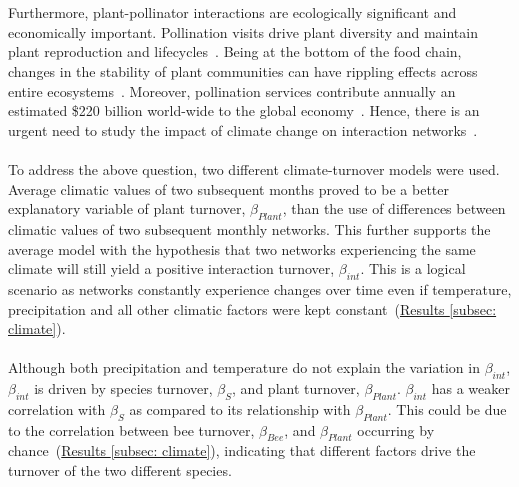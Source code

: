 \documentclass[11pt]{article}
\begin{document}
\\
\\
Furthermore, plant-pollinator interactions are ecologically significant and economically important. Pollination visits drive plant diversity and maintain plant reproduction and lifecycles~\citep{Olesen2008}. Being at the bottom of the food chain, changes in the stability of plant communities can have rippling effects across entire ecosystems~\citep{Scaven2013}. Moreover, pollination services contribute annually an estimated \$220 billion world-wide to the global economy~\citep{Gallai2009}. Hence, there is an urgent need to study the impact of climate change on interaction networks~\citep{Scaven2013}.\\
\\
To address the above question, two different climate-turnover models were used. Average climatic values of two subsequent months proved to be a better explanatory variable of plant turnover, $\beta_{Plant}$, than the use of differences between climatic values of two subsequent monthly networks. This further supports the average model with the hypothesis that two networks experiencing the same climate will still yield a positive interaction turnover, $\beta_{int}$. This is a logical scenario as networks constantly experience changes over time even if temperature, precipitation and all other climatic factors were kept constant~(\hyperref[subsec: climate]{Results \ref{subsec: climate}}).\\
\\
Although both precipitation and temperature do not explain the variation in $\beta_{int}$, $\beta_{int}$ is driven by species turnover, $\beta_{S}$, and plant turnover, $\beta_{Plant}$. $\beta_{int}$ has a weaker correlation with $\beta_{S}$ as compared to its relationship with $\beta_{Plant}$. This could be due to the correlation between bee turnover, $\beta_{Bee}$, and $\beta_{Plant}$ occurring by chance~(\hyperref[subsec: climate]{Results \ref{subsec: climate}}), indicating that different factors drive the turnover of the two different species. \\
\\
\end{document}
